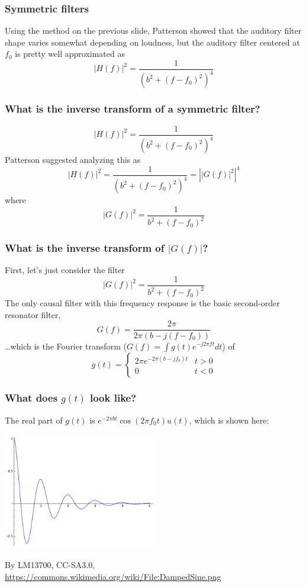 \documentclass{beamer}
\begin{document}
\begin{frame}
  \frametitle{Symmetric filters}

  Using the method on the previous slide, Patterson showed that the
  auditory filter shape varies somewhat depending on loudness, but the
  auditory filter centered at $f_0$ is pretty well approximated as
  \[
  |H(f)|^2 = \frac{1}{(b^2+(f-f_0)^2)^4}
  \]
\end{frame}

\begin{frame}
  \frametitle{What is the inverse transform of a symmetric filter?}

  \[
  |H(f)|^2 = \frac{1}{(b^2+(f-f_0)^2)^4}
  \]
  Patterson suggested analyzing this as
  \[
  |H(f)|^2 = \frac{1}{(b^2+(f-f_0)^2)^4}= \left||G(f)|^2\right|^4
  \]
  where
  \[
  |G(f)|^2 = \frac{1}{b^2+(f-f_0)^2}
  \]
\end{frame}

\begin{frame}
  \frametitle{What is the inverse transform of $|G(f)|$?}

  First, let's just consider the filter
  \[
  |G(f)|^2 = \frac{1}{b^2+(f-f_0)^2}
  \]
  The only causal filter with this frequency response is the basic
  second-order resonator filter,
  \[
  G(f) = \frac{2\pi}{2\pi (b-j(f-f_0))}
  \]
  \ldots which is the Fourier transform ($G(f)=\int g(t)e^{-j2\pi ft}dt$) of 
  \[
  g(t) = \begin{cases}
    2\pi e^{-2\pi (b-jf_0)t} & t>0\\
    0 & t<0
  \end{cases}
  \]
\end{frame}

\begin{frame}
  \frametitle{What does $g(t)$ look like?}

  The real part of $g(t)$ is $e^{-2\pi bt}\cos(2\pi f_0t)u(t)$, which is
  shown here:
  \centerline{\includegraphics[height=2in]{dampedsine.png}}
  \begin{tiny}
    By LM13700, CC-SA3.0,
    \url{https://commons.wikimedia.org/wiki/File:DampedSine.png}
  \end{tiny}
\end{frame}
\end{document}
